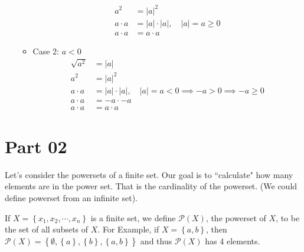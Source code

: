 \documentclass{article}
\begin{document}
\begin{enumerate}[label = \textbf{\alph*)}]
\begin{itemize}
\begin{align*}
			            a^2          & = |a|^2                               \\
			            a \cdot a    & = |a| \cdot |a|, \quad |a| = a \geq 0 \\
			            a \cdot a    & = a \cdot a
		            \end{align*}
		      \item Case 2: $ a < 0 $
		            \begin{align*}
			            \sqrt{ a^2 } & = |a|                                                                 \\
			            a^2          & = |a|^2                                                               \\
			            a \cdot a    & = |a| \cdot |a|, \quad |a| = a < 0 \implies -a > 0 \implies -a \geq 0 \\
			            a \cdot a    & = -a \cdot -a                                                         \\
			            a \cdot a    & = a \cdot a
		            \end{align*}
	      \end{itemize}
\end{enumerate}

\section{Part 02}

Let's consider the powersets of a finite set. Our goal is to ``calculate" how many elements are in the power set. That is the cardinality of the powerset. (We could define powerset from an infinite set).

If $ X = \left\{ x_1, x_2, \cdots, x_n \right\} $ is a finite set, we define $ \mathcal{P}(X) $, the powerset of $ X $, to be the set of all subsets of $ X $. For Example, if $ X = \left\{ a, b \right\} $, then $ \mathcal{P}(X) = \left\{ \emptyset, \left\{ a \right\}, \left\{ b \right\}, \left\{ a, b \right\} \right\} $ and thus $ \mathcal{P}(X) $ has 4 elements.
\end{document}
